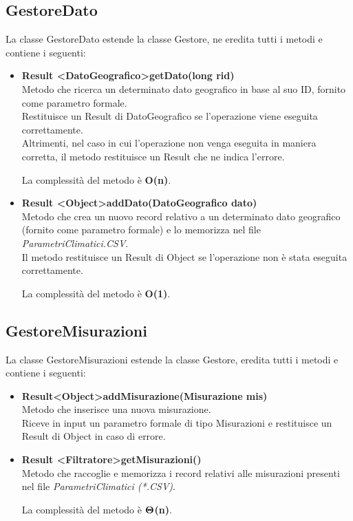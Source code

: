 \documentclass[a4paper, 12pt]{scrreprt}
\begin{document}
			\subsection{GestoreDato}
			La classe GestoreDato estende la classe Gestore, ne eredita tutti i metodi e contiene i seguenti:
			\begin{itemize}
				\item \textbf{Result \textless DatoGeografico\textgreater getDato(long rid)}
				\\Metodo che ricerca un determinato dato geografico in base al suo ID, fornito come parametro formale.
				\\Restituisce un Result di DatoGeografico se l'operazione viene eseguita correttamente.
				\\Altrimenti, nel caso in cui l'operazione non venga eseguita in maniera corretta, il metodo restituisce un Result che ne indica l'errore.
				
				La complessit\`a del metodo \`e \textbf{O(n)}.
				
				\item \textbf {Result \textless Object\textgreater addDato(DatoGeografico dato)}
				\\Metodo che crea un nuovo record relativo a un determinato dato geografico (fornito come parametro formale) e lo memorizza nel file \textit{ParametriClimatici.CSV}.
				\\Il metodo restituisce un Result di Object se l'operazione non \`e stata eseguita correttamente.
				
				La complessit\`a del metodo è \textbf{O(1)}.
				
			\end{itemize}

			\subsection{GestoreMisurazioni}
			La classe GestoreMisurazioni estende la classe Gestore, eredita tutti i metodi e contiene i seguenti:
			\begin{itemize}
				\item \textbf{Result\textless Object\textgreater addMisurazione(Misurazione mis)}
				\\Metodo che inserisce una nuova misurazione.
				\\Riceve in input un parametro formale di tipo Misurazioni e restituisce un Result di Object in caso di errore.

				\item \textbf {Result \textless Filtratore\textgreater getMisurazioni()}
				\\Metodo che raccoglie e memorizza i record relativi alle misurazioni presenti nel file \textit{ParametriClimatici (*.CSV)}.
				
				La complessit\`a del metodo \`e $\mathbf{\Theta}$\textbf{(n)}.
			\end{itemize}
\end{document}
